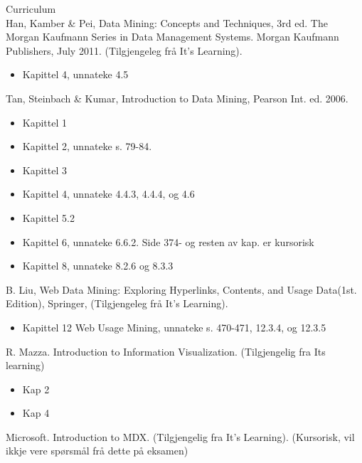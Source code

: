 
{\Huge Curriculum} \\

	Han, Kamber \& Pei, Data Mining: Concepts and Techniques, 3rd ed. The Morgan Kaufmann Series 
	in Data Management Systems. Morgan Kaufmann Publishers, July 2011.
	(Tilgjengeleg frå It’s Learning). 
		\begin{itemize}
			\item Kapittel 4, unnateke 4.5
		\end{itemize} 
	
	Tan, Steinbach \& Kumar, Introduction to Data Mining, Pearson Int. ed. 2006. 
		\begin{itemize}
			\item Kapittel 1 
			\item Kapittel 2, unnateke s. 79-84. 
			\item Kapittel 3 
			\item Kapittel 4, unnateke 4.4.3, 4.4.4, og 4.6 
			\item Kapittel 5.2 
			\item Kapittel 6, unnateke 6.6.2. Side 374- og resten av kap. er kursorisk 
			\item Kapittel 8, unnateke 8.2.6 og 8.3.3 
		\end{itemize}

	B. Liu, Web Data Mining: Exploring Hyperlinks, Contents, and Usage Data(1st. Edition), Springer, 
	(Tilgjengeleg frå It’s Learning). 
		\begin{itemize}
			\item Kapittel 12 Web Usage Mining, unnateke s. 470-471, 12.3.4, og 12.3.5 
		\end{itemize}

	R. Mazza. Introduction to Information Visualization. (Tilgjengelig fra Its learning)
		\begin{itemize}
			\item Kap 2
			\item Kap 4
		\end{itemize}

	Microsoft. Introduction to MDX. (Tilgjengelig fra It's Learning). (Kursorisk, vil ikkje vere spørsmål 
	frå dette på eksamen)
